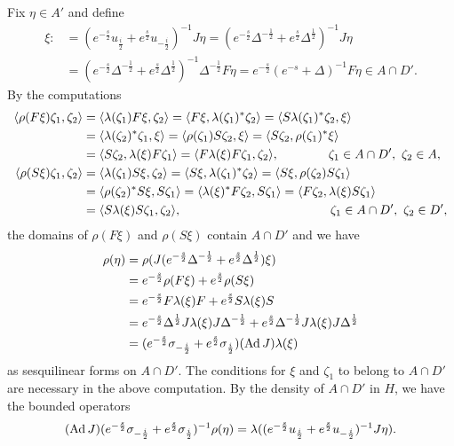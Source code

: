 \documentclass{../../../small}
\begin{document}
\begin{pf}
Fix $\eta\in A'$ and define
\begin{align*}
\xi:&=(e^{-\frac s2}u_{\frac i2}+e^{\frac s2}u_{-\frac i2})^{-1}J\eta
=(e^{-\frac s2}\Delta^{-\frac12}+e^{\frac s2}\Delta^{\frac12})^{-1}J\eta\\
&=(e^{-\frac s2}\Delta^{-\frac12}+e^{\frac s2}\Delta^{\frac12})^{-1}\Delta^{-\frac12}F\eta
=e^{-\frac s2}(e^{-s}+\Delta)^{-1}F\eta
\in A\cap D'.
\end{align*}
By the computations
\begin{align*}
\langle\rho(F\xi)\zeta_1,\zeta_2\rangle
&=\langle\lambda(\zeta_1)F\xi,\zeta_2\rangle
=\langle F\xi,\lambda(\zeta_1)^*\zeta_2\rangle
=\langle S\lambda(\zeta_1)^*\zeta_2,\xi\rangle\\
&=\langle\lambda(\zeta_2)^*\zeta_1,\xi\rangle
=\langle\rho(\zeta_1)S\zeta_2,\xi\rangle
=\langle S\zeta_2,\rho(\zeta_1)^*\xi\rangle\\
&=\langle S\zeta_2,\lambda(\xi)F\zeta_1\rangle
=\langle F\lambda(\xi)F\zeta_1,\zeta_2\rangle,\qquad\qquad\zeta_1\in A\cap D',\ \zeta_2\in A,\\
\langle\rho(S\xi)\zeta_1,\zeta_2\rangle
&=\langle\lambda(\zeta_1)S\xi,\zeta_2\rangle
=\langle S\xi,\lambda(\zeta_1)^*\zeta_2\rangle
=\langle S\xi,\rho(\zeta_2)S\zeta_1\rangle\\
&=\langle\rho(\zeta_2)^*S\xi,S\zeta_1\rangle
=\langle\lambda(\xi)^*F\zeta_2,S\zeta_1\rangle
=\langle F\zeta_2,\lambda(\xi)S\zeta_1\rangle\\
&=\langle S\lambda(\xi)S\zeta_1,\zeta_2\rangle,\qquad\qquad\qquad\qquad\qquad\qquad\zeta_1\in A\cap D',\ \zeta_2\in D',
\end{align*}
the domains of $\rho(F\xi)$ and $\rho(S\xi)$ contain $A\cap D'$ and we have
\begin{align*}
\rho(\eta)
&=\rho(J(e^{-\frac s2}\Delta^{-\frac12}+e^{\frac s2}\Delta^{\frac12})\xi)\\
&=e^{-\frac s2}\rho(F\xi)+e^{\frac s2}\rho(S\xi)\\
&=e^{-\frac s2}F\lambda(\xi)F+e^{\frac s2}S\lambda(\xi)S\\
&=e^{-\frac s2}\Delta^{\frac12}J\lambda(\xi)J\Delta^{-\frac12}+e^{\frac s2}\Delta^{-\frac12}J\lambda(\xi)J\Delta^{\frac12}\\
&=(e^{-\frac s2}\sigma_{-\frac i2}+e^{\frac s2}\sigma_{\frac i2})(\operatorname{Ad} J)\lambda(\xi)
\end{align*}
as sesquilinear forms on $A\cap D'$.
The conditions for $\xi$ and $\zeta_1$ to belong to $A\cap D'$ are necessary in the above computation.
By the density of $A\cap D'$ in $H$, we have the bounded operators
\[(\operatorname{Ad} J)(e^{-\frac s2}\sigma_{-\frac i2}+e^{\frac s2}\sigma_{\frac i2})^{-1}\rho(\eta)=\lambda((e^{-\frac s2}u_{\frac i2}+e^{\frac s2}u_{-\frac i2})^{-1}J\eta).\]



\end{pf}
\end{document}
